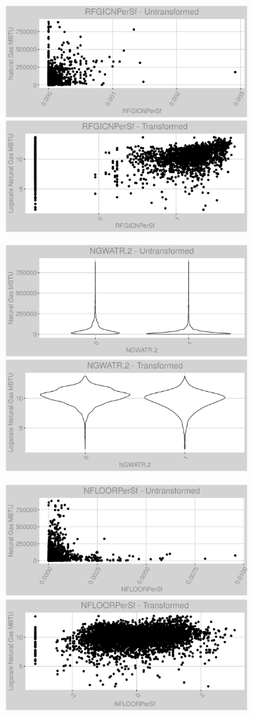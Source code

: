 \FloatBarrier
\newpage
\begin{figure}
\centering
\begin{subfigure}{1\textwidth}
\centering
\includegraphics[width=.49\textwidth, height=0.3\textheight]{Images/natural_gas_psf_var_original_9.png}
\includegraphics[width=.49\textwidth, height=0.3\textheight]{Images/natural_gas_psf_var_transformed_9.png}
\end{subfigure}
\begin{subfigure}{1\textwidth}
\centering
\includegraphics[width=.49\textwidth, height=0.3\textheight]{Images/natural_gas_psf_var_original_10.png}
\includegraphics[width=.49\textwidth, height=0.3\textheight]{Images/natural_gas_psf_var_transformed_10.png}
\end{subfigure}
\begin{subfigure}{1\textwidth}
\centering
\includegraphics[width=.49\textwidth, height=0.3\textheight]{Images/natural_gas_psf_var_original_11.png}
\includegraphics[width=.49\textwidth, height=0.3\textheight]{Images/natural_gas_psf_var_transformed_11.png}
\end{subfigure}
\end{figure}
